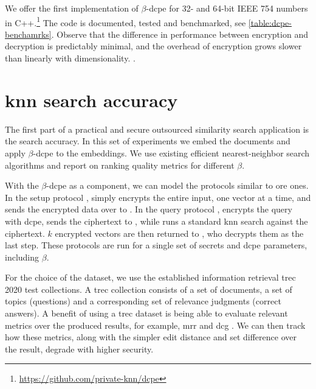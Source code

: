 		We offer the first implementation of \cite{dcpe} $\beta$-\acrshort{dcpe} for 32- and 64-bit IEEE 754 numbers in C++.\footnote{
			\url{https://github.com/private-knn/dcpe}
		}
		The code is documented, tested and benchmarked, see \cref{table:dcpe-benchamrks}.
		Observe that the difference in performance between encryption and decryption is predictably minimal, and the overhead of encryption grows slower than linearly with dimensionality.
.
		

	\section{\texorpdfstring{\acrshort{knn}}{kNN} search accuracy}

		The first part of a practical and secure outsourced similarity search application is the search accuracy.
		In this set of experiments we embed the documents and apply $\beta$-\acrshort{dcpe} to the embeddings.
		We use existing efficient nearest-neighbor search algorithms and report on ranking quality metrics for different $\beta$.

		With the $\beta$-\acrshort{dcpe} as a component, we can model the protocols similar to \acrshort{ore} ones.
		In the setup protocol \protocolSetup{}, \user{} simply encrypts the entire input, one vector at a time, and sends the encrypted data over to \server{}.
		In the query protocol \protocolQuery{}, \user{} encrypts the query with \acrshort{dcpe}, sends the ciphertext to \server{}, while \server{} runs a standard \acrshort{knn} search against the ciphertext.
		$k$ encrypted vectors are then returned to \user{}, who decrypts them as the last step.
		These protocols are run for a single set of secrets and \acrshort{dcpe} parameters, including $\beta$.

		For the choice of the dataset, we use the established information retrieval \acrshort{trec} 2020 test collections.
		A \acrshort{trec} collection consists of a set of documents, a set of topics (questions) and a corresponding set of relevance judgments (correct answers).
		A benefit of using a \acrshort{trec} dataset is being able to evaluate relevant metrics over the produced results, for example, \acrshort{mrr} \cite{mrr} and \acrshort{dcg} \cite{dcg}.
		We can then track how these metrics, along with the simpler edit distance and set difference over the result, degrade with higher security.

